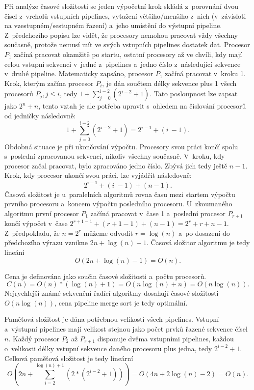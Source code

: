 \documentclass[a4paper, 12pt]{article}[21.3.2015]
\begin{document}
Při analýze časové složitosti se jeden výpočetní krok skládá z~porovnání dvou čísel z~vrcholů vstupních pipelines, vytažení většího/menšího z~nich (v~závisloti na vzestupném/sestupném řazení) a~jeho umístění do výstupní pipeline. Z~předchozího popisu lze vidět, že procesory nemohou pracovat vždy všechny současně, protože nemusí mít ve svých vstupních pipelines dostatek dat. Procesor \(P_1\) začíná pracovat okamžitě po startu, ostatní procesory až ve chvíli, kdy mají celou vstupní sekvenci v~jedné z~pipelines a~jedno číslo z~následující sekvence v~druhé pipeline. Matematicky zapsáno, procesor \(P_1\) začíná pracovat v~kroku 1. Krok, kterým začína procesor \(P_i\), je dán součtem délky sekvence plus 1 všech procesorů \(P_j, j \leq i\), tedy \(1 + \sum_{j = 0}^{i - 2}(2^{i - 2} + 1)\). Tato posloupnost lze zapsat jako \(2^n + n\), tento vztah je ale potřeba upravit s~ohledem na číslování procesorů od jedničky následovně:
\[
	1 + \sum_{j = 0}^{i - 2}(2^{i - 2} + 1) = 2^{i - 1} + (i~- 1).
\]
Obdobná situace je při ukončování výpočtu. Procesory svou práci končí spolu s~poslední zpracovanou sekvencí, nikoliv všechny současně. V~kroku, kdy procesor začal pracovat, bylo zpracováno jedno číslo. Zbývá jich tedy ještě \(n - 1\). Krok, kdy procesor ukončí svou práci, lze vyjádřit následovně:
\[
	2^{i - 1} + (i~- 1) + (n - 1).
\]
Časová složitost je u~paralelních algoritmů rovna času mezi startem výpočtu prvního procesoru a~koncem výpočtu posledního procesoru. U~zkoumaného algoritmu první procesor \(P_1\) začíná pracovat v~čase 1 a~poslední procesor \(P_{r + 1}\) končí výpočet v~čase \(2^{r + 1 - 1} + (r + 1 - 1) + (n - 1) = 2^r + r + n - 1\). Z~předpokladu, že \(n = 2^r\) můžeme odvodit \(r = \log(n)\) a~po dosazení do předchozího výrazu vznikne \(2n + \log(n) - 1\). Časová složitor algoritmu je tedy lineání
\[
	O(2n + \log(n) - 1) = O(n).
\]

Cena je definována jako součin časové složitosti a~počtu procesorů.
\[
	C(n) = O(n) * (\log(n) + 1) = O(n\log(n) + n) = O(n\log(n)).
\]
Nejrychlejší známé sekvenční řadící algoritmy dosahují časové složitosti \(O(n\log(n))\), cena pipeline merge sort je tedy optimální.

Paměťová složitost je dána potřebnou velikostí všech pipelines. Vstupní a~výstupní pipelines mají velikost stejnou jako počet prvků řazené sekvence čísel \(n\). Každý procesor \(P_2\) až \(P_{r + 1}\) disponuje dvěma vstupními pipelines, každou o~velikosti délky vstupní sekvence daného procesoru plus jedna, tedy \(2^{i - 2} + 1\). Celková paměťová složitost je tedy lineární
\[
	O(2n + \sum_{i = 2}^{\log(n) + 1}(2 * (2^{i - 2} + 1))) = O(4n + 2\log(n) - 2) = O(n).
\]
\end{document}
